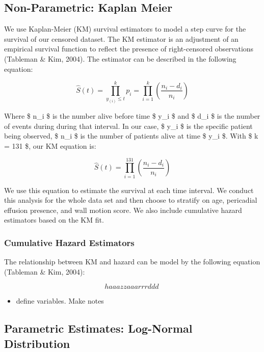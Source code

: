 \documentclass[
]{article}
\providecommand{\tightlist}{%
  \setlength{\itemsep}{0pt}\setlength{\parskip}{0pt}}
\begin{document}
\hypertarget{non-parametric-kaplan-meier}{%
\subsection{Non-Parametric: Kaplan
Meier}\label{non-parametric-kaplan-meier}}

We use Kaplan-Meier (KM) survival estimators to model a step curve for
the survival of our censored dataset. The KM estimator is an adjustment
of an empirical survival function to reflect the presence of
right-censored observations (Tableman \& Kim, 2004). The estimator can
be described in the following equation:

\[ \hat{S}(t) = \prod_{y_{(i)}\leq{t}}^{k} p_i = \prod_{i=1}^{k} (\frac{n_i -d_i}{n_i}) \]

Where \$ n\_i \$ is the number alive before time \$ y\_i \$ and \$ d\_i
\$ is the number of events during during that interval. In our case, \$
y\_i \$ is the specific patient being observed, \$ n\_i \$ is the number
of patients alive at time \$ y\_i \$. With \$ k = 131 \$, our KM
equation is:

\[ \hat{S}(t) = \prod_{i=1}^{131} (\frac{n_i -d_i}{n_i}) \]

We use this equation to estimate the survival at each time interval. We
conduct this analysis for the whole data set and then choose to stratify
on age, pericadial effusion presence, and wall motion score. We also
include cumulative hazard estimators based on the KM fit.

\hypertarget{cumulative-hazard-estimators}{%
\subsubsection{Cumulative Hazard
Estimators}\label{cumulative-hazard-estimators}}

The relationship between KM and hazard can be model by the following
equation (Tableman \& Kim, 2004):

\[ haaazzaaarrrddd\  \]

\begin{itemize}
\tightlist
\item
  define variables. Make notes
\end{itemize}

\hypertarget{parametric-estimates-log-normal-distribution}{%
\subsection{Parametric Estimates: Log-Normal
Distribution}\label{parametric-estimates-log-normal-distribution}}
\end{document}
